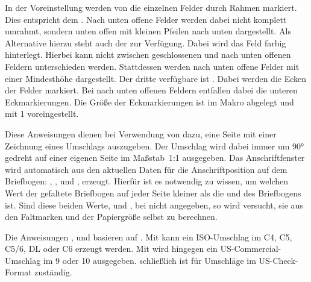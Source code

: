 \begin{Declaration}
\end{Declaration}
In der Voreinstellung werden von  die einzelnen Felder
durch Rahmen markiert. Dies entspricht dem
 . Nach unten offene Felder werden dabei nicht
komplett umrahmt, sondern unten offen mit kleinen Pfeilen nach unten
dargestellt. Als Alternative hierzu steht auch der
  zur Verfügung. Dabei wird das Feld farbig
hinterlegt. Hierbei kann nicht zwischen geschlossenen und nach unten offenen
Feldern unterschieden werden. Stattdessen werden nach unten offene Felder mit
einer Mindesthöhe dargestellt. Der dritte verfügbare
 ist . Dabei werden die Ecken der Felder
markiert. Bei nach unten offenen Feldern entfallen dabei die unteren
Eckmarkierungen. Die Größe der Eckmarkierungen ist im Makro 
abgelegt und mit 1 voreingestellt.%
\EndIndexGroup


\begin{Declaration}
\end{Declaration}
Diese Anweisungen dienen bei Verwendung von  dazu, eine
Seite mit einer Zeichnung eines Umschlags auszugeben. Der Umschlag wird dabei
immer um 90° gedreht auf einer eigenen Seite im Maßstab~1:1 ausgegeben. Das
Anschriftfenster wird automatisch aus den aktuellen Daten für die
Anschriftposition auf dem Briefbogen: ,
,
 und
, erzeugt. Hierfür ist es notwendig zu
wissen, um welchen Wert der gefaltete Briefbogen auf jeder Seite kleiner als
die  und  des Briefbogens ist. Sind diese beiden
Werte,  und , bei  nicht
angegeben, so wird versucht, sie aus den Faltmarken und der Papiergröße selbst
zu berechnen.

Die Anweisungen ,  und
 basieren auf . Mit
 kann ein ISO-Umschlag im  C4, C5, C5/6,
DL oder C6 erzeugt werden. Mit
 wird hingegen ein US-Commercial-Umschlag im
 9 oder 10 ausgegeben.  schließlich ist für
Umschläge im US-Check-Format zuständig.


